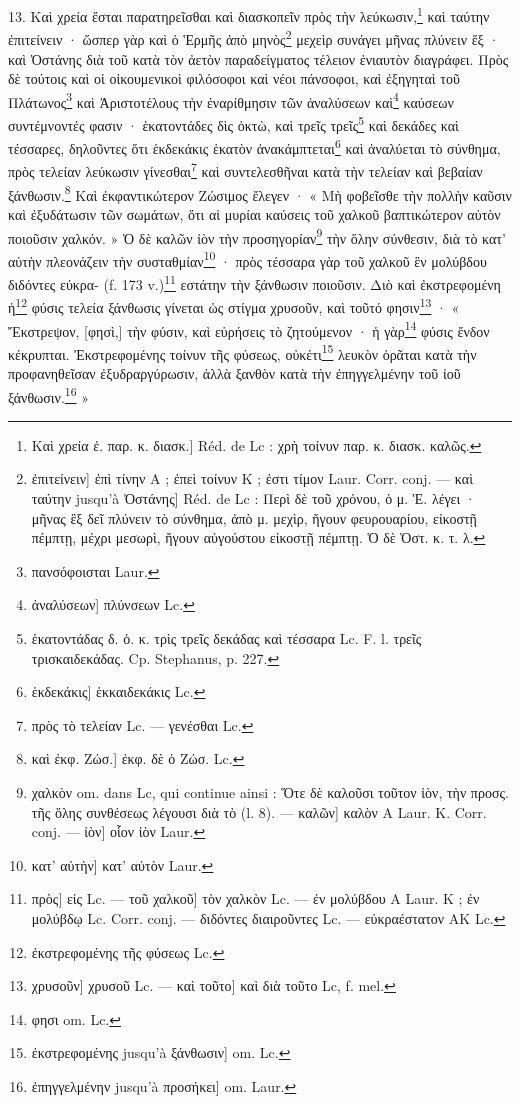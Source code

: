 \documentclass[landscape, a4paper, 11pt, oneside, polutonikogreek, french]{article}
\begin{document}
13. Καὶ χρεία ἔσται παρατηρεῖσθαι καὶ διασκοπεῖν πρὸς τὴν λεύκωσιν,\footnote{Καὶ χρεία ἐ. παρ. κ. διασκ.] Réd. de Lc : χρὴ τοίνυν παρ. κ. διασκ. καλῶς.} καὶ ταύτην ἐπιτείνειν · ὥσπερ γὰρ καὶ ὁ Ἑρμῆς ἀπὸ μηνὸς\footnote{ἐπιτείνειν] ἐπὶ τίνην A ; ἐπεὶ τοίνυν K ; ἐστι τίμον Laur. Corr. conj. --- καὶ ταύτην jusqu'à Ὀστάνης] Réd. de Lc : Περὶ δὲ τοῦ χρόνου, ὁ μ. Ἑ. λέγει · μῆνας ἓξ δεῖ πλύνειν τὸ σύνθημα, ἀπὸ μ. μεχὶρ, ἤγουν φευρουαρίου, εἰκοστῇ πέμπτῃ, μέχρι μεσωρὶ, ἤγουν αὐγούστου εἰκοστῇ πέμπτῃ. Ὁ δὲ Ὁστ. κ. τ. λ.} μεχεὶρ συνάγει μῆνας πλύνειν ἕξ · καὶ Ὀστάνης διὰ τοῦ κατὰ τὸν ἀετὸν παραδείγματος τέλειον ἐνιαυτὸν διαγράφει. Πρὸς δὲ τούτοις καὶ οἱ οἰκουμενικοὶ φιλόσοφοι καὶ νέοι πάνσοφοι, καὶ ἐξηγηταὶ τοῦ Πλάτωνος\footnote{πανσόφοισται Laur.} καὶ Ἀριστοτέλους τὴν ἐναρίθμησιν τῶν ἀναλύσεων καὶ\footnote{ἀναλύσεων] πλύνσεων Lc.} καύσεων συντέμνοντές φασιν · ἑκατοντάδες δὶς ὀκτὼ, καὶ τρεῖς τρεῖς\footnote{ἑκατοντάδας δ. ὁ. κ. τρὶς τρεῖς δεκάδας καὶ τέσσαρα Lc. F. l. τρεῖς τρισκαιδεκάδας. Cp. Stephanus, p. 227.} καὶ δεκάδες καὶ τέσσαρες, δηλοῦντες ὅτι ἑκδεκάκις ἑκατὸν ἀνακάμπτεται\footnote{ἑκδεκάκις] ἑκκαιδεκάκις Lc.} καὶ ἀναλύεται τὸ σύνθημα, πρὸς τελείαν λεύκωσιν γίνεσθαι\footnote{πρὸς τὸ τελείαν Lc. --- γενέσθαι Lc.} καὶ συντελεσθῆναι κατὰ τὴν τελείαν καὶ βεβαίαν ξάνθωσιν.\footnote{καὶ ἐκφ. Ζώσ.] ἐκφ. δὲ ὁ Ζώσ. Lc.} Καὶ ἐκφαντικώτερον Ζώσιμος ἔλεγεν · « Μὴ φοβεῖσθε τὴν πολλὴν καῦσιν καὶ ἐξυδάτωσιν τῶν σωμάτων, ὅτι αἱ μυρίαι καύσεις τοῦ χαλκοῦ βαπτικώτερον αὐτὸν ποιοῦσιν χαλκόν. » Ὁ δὲ καλῶν ἰὸν τὴν προσηγορίαν\footnote{χαλκὸν om. dans Lc, qui continue ainsi : Ὅτε δὲ καλοῦσι τοῦτον ἰὸν, τὴν προσς. τῆς ὅλης συνθέσεως λέγουσι διὰ τὸ (l. 8). --- καλῶν] καλὸν A Laur. K. Corr. conj. --- ἰὸν] οἷον ἰὸν Laur.} τὴν ὅλην σύνθεσιν, διὰ τὸ κατ' αὐτὴν πλεονάζειν τὴν συσταθμίαν\footnote{κατ' αὐτὴν] κατ' αὐτὸν Laur.} · πρὸς τέσσαρα γὰρ τοῦ χαλκοῦ ἓν μολύβδου διδόντες εὐκρα- (f. 173 v.)\footnote{πρὸς] εἰς Lc. --- τοῦ χαλκοῦ] τὸν χαλκὸν Lc. --- ἐν μολύβδου A Laur. K ; ἐν μολύβδῳ Lc. Corr. conj. --- διδόντες διαιροῦντες Lc. --- εὐκραέστατον AK Lc.} εστάτην τὴν ξάνθωσιν ποιοῦσιν. Διὸ καὶ ἐκστρεφομένη ἡ\footnote{ἐκστρεφομένης τῆς φύσεως Lc.} φύσις τελεία ξάνθωσις γίνεται ὡς στίγμα χρυσοῦν, καὶ τοῦτό φησιν\footnote{χρυσοῦν] χρυσοῦ Lc. --- καὶ τοῦτο] καὶ διὰ τοῦτο Lc, f. mel.} · « Ἔκστρεψον, [φησὶ,] τὴν φύσιν, καὶ εὑρήσεις τὸ ζητούμενον · ἡ γὰρ\footnote{φησι om. Lc.} φύσις ἔνδον κέκρυπται. Ἐκστρεφομένης τοίνυν τῆς φύσεως, οὐκέτι\footnote{ἐκστρεφομένης jusqu'à ξάνθωσιν] om. Lc.} λευκὸν ὁρᾶται κατὰ τὴν προφανηθεῖσαν ἐξυδραργύρωσιν, ἀλλὰ ξανθὸν κατὰ τὴν ἐπηγγελμένην τοῦ ἰοῦ ξάνθωσιν.\footnote{ἐπηγγελμένην jusqu'à προσήκει] om. Laur.} »
\end{document}
